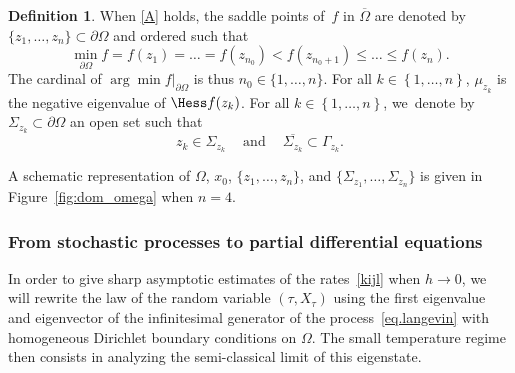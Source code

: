 \documentclass[JEP,XML,SOM,Unicode,NoEqCountersInSection,NoFloatCountersInSection,published]{cedram}
\newcommand{\quand}{\quad\text{and}\quad}
\theoremstyle{plain}
\theoremstyle{definition}
\newtheorem{definition}[proposition]{Definition}
\begin{document}
\begin{definition}\label{eq.de-introd}
When \ref{A} holds, the saddle points of~$f$ in $\overline{\Omega}$ are denoted by $\{z_1,\ldots,z_n\} \subset
\partial \Omega$ and ordered such that
\begin{equation}\label{eq.n0}
\min_{\partial \Omega}f=f(z_1)=\ldots
= f(z_{n_0}) < f(z_{n_0+1}) \le \ldots \leq f(z_n).
\end{equation}
The cardinal of $\arg\min f|_{\partial \Omega}$ is thus $n_0 \in \{1,
\ldots, n\}$. For all $k\in \left\{1,\ldots,n\right\}$, $\mu_{z_k}$ is the negative eigenvalue of $\Hess f (z_k)$.
For all $k\in \left\{1,\ldots,n\right\}$, we~denote by
$\Sigma_{z_k} \subset \partial \Omega$ an open set such that
\begin{equation}\label{Sigma_k}
z_k \in \Sigma_{z_k} \ \quand \ \overline{\Sigma_{z_k} }\subset \Gamma_{z_k}.
\end{equation}
\end{definition}

A schematic representation of $\Omega$, $x_0$, $\{z_1,\ldots,z_n\}$, and $\{\Sigma_{z_1},\ldots, \Sigma_{z_n}\}$ is given in Figure~\ref{fig:dom_omega} when $n=4$.

\subsubsection{From stochastic processes to partial differential equations}
\label{sec.diri}

In order to give sharp asymptotic estimates of the rates~\eqref{kijl}
when $h \to 0$, we
will rewrite the law of the random variable $(\tau,X_\tau)$ using the
first eigenvalue and eigenvector of the infinitesimal generator of the
process~\eqref{eq.langevin} with homogeneous Dirichlet boundary
conditions on $\Omega$. The small temperature regime then consists in
analyzing the semi-classical limit of this eigenstate.
\end{document}
